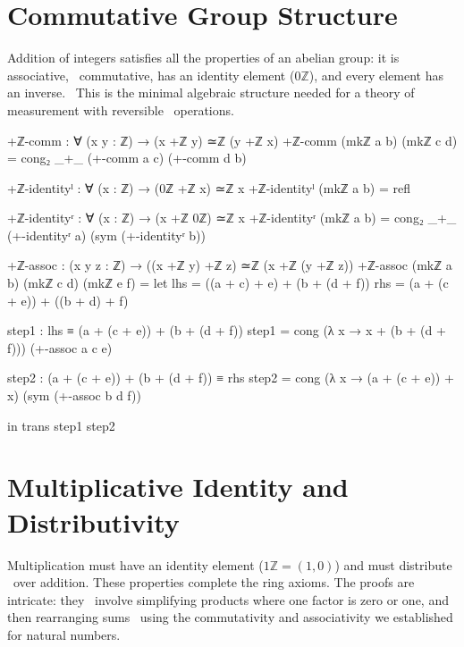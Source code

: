 \documentclass[11pt,a4paper]{book}
\begin{document}
\section{Commutative Group Structure}

Addition of integers satisfies all the properties of an abelian group: it is associative, \
commutative, has an identity element ($0\mathbb{Z}$), and every element has an inverse. \
This is the minimal algebraic structure needed for a theory of measurement with reversible \
operations.

\begin{code}
+ℤ-comm : ∀ (x y : ℤ) → (x +ℤ y) ≃ℤ (y +ℤ x)
+ℤ-comm (mkℤ a b) (mkℤ c d) = 
  cong₂ _+_ (+-comm a c) (+-comm d b)

+ℤ-identityˡ : ∀ (x : ℤ) → (0ℤ +ℤ x) ≃ℤ x
+ℤ-identityˡ (mkℤ a b) = refl

+ℤ-identityʳ : ∀ (x : ℤ) → (x +ℤ 0ℤ) ≃ℤ x
+ℤ-identityʳ (mkℤ a b) = cong₂ _+_ (+-identityʳ a) (sym (+-identityʳ b))

+ℤ-assoc : (x y z : ℤ) → ((x +ℤ y) +ℤ z) ≃ℤ (x +ℤ (y +ℤ z))
+ℤ-assoc (mkℤ a b) (mkℤ c d) (mkℤ e f) = 
  let
    lhs = ((a + c) + e) + (b + (d + f))
    rhs = (a + (c + e)) + ((b + d) + f)
    
    step1 : lhs ≡ (a + (c + e)) + (b + (d + f))
    step1 = cong (λ x → x + (b + (d + f))) (+-assoc a c e)
    
    step2 : (a + (c + e)) + (b + (d + f)) ≡ rhs
    step2 = cong (λ x → (a + (c + e)) + x) (sym (+-assoc b d f))
    
  in trans step1 step2
\end{code}

\section{Multiplicative Identity and Distributivity}

Multiplication must have an identity element ($1\mathbb{Z} = (1,0)$) and must distribute \
over addition. These properties complete the ring axioms. The proofs are intricate: they \
involve simplifying products where one factor is zero or one, and then rearranging sums \
using the commutativity and associativity we established for natural numbers.
\end{document}
